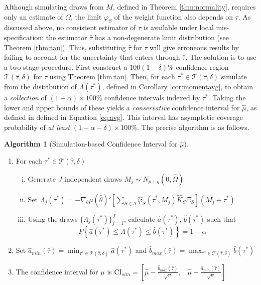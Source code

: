 \documentclass[12pt]{article}
\theoremstyle{definition}
\newtheorem{alg}{Algorithm}[section]
\begin{document}
Although simulating draws from $M$, defined in Theorem \ref{thm:normality}, requires only an estimate of $\Omega$, the limit $\varphi_S$ of the weight function also depends on $\tau$. 
As discussed above, no consistent estimator of $\tau$ is available under local mis-specification: the estimator $\widehat{\tau}$ has a non-degenerate limit distribution (see Theorem \ref{thm:tau}). 
Thus, substituting $\widehat{\tau}$ for $\tau$ will give erroneous results by failing to account for the uncertainty that enters through $\widehat{\tau}$. 
The solution is to use a two-stage procedure. 
First construct a  $100(1-\delta)\%$ confidence region $\mathscr{T}(\widehat{\tau},\delta)$ for $\tau$ using Theorem \ref{thm:tau}. 
Then, for each $\tau^* \in \mathscr{T}(\widehat{\tau},\delta)$ simulate from the distribution of $\Lambda(\tau^*)$, defined in Corollary \ref{cor:momentavg}, to obtain a \emph{collection} of $(1-\alpha)\times 100\%$ confidence intervals indexed by $\tau^*$. 
Taking the lower and upper bounds of these yields a \emph{conservative} confidence interval for $\widehat{\mu}$, as defined in defined in Equation \ref{eq:avg}. 
This interval has asymptotic coverage probability of \emph{at least} $(1-\alpha-\delta)\times 100\%$.
The precise algorithm is as follows.
\begin{alg}[Simulation-based Confidence Interval for $\widehat{\mu}$]
\label{alg:conf}
\mbox{}
\begin{enumerate}
	\item For each $\tau^* \in \mathscr{T}(\widehat{\tau},\delta)$ 
		\begin{enumerate}[(i)]
			\item Generate $J$ independent draws $M_j \sim N_{p+q}( 0, \widehat{\Omega} )$
			\item Set $\Lambda_j(\tau^*) = -\nabla_\theta\mu(\widehat{\theta})'\left[\sum_{S \in \mathscr{S}} \widehat{\varphi}_S(\tau^*,M_j) \widehat{K}_S\Xi_S\right] (M_j + \tau^*)$
			\item Using the draws $\{\Lambda_j(\tau^*)\}_{j=1}^J$, calculate $\widehat{a}(\tau^*)$, $\widehat{b}(\tau^*)$ such that
		$$P\left\{ \widehat{a}(\tau^*) \leq\Lambda(\tau^*)\leq \widehat{b}(\tau^*) \right\} = 1 - \alpha$$
		\end{enumerate}
	\item Set $\displaystyle \widehat{a}_{min}(\widehat{\tau})=\min_{\tau^* \in \mathscr{T}(\widehat{\tau},\delta)} \widehat{a}(\tau^*)$ and $\displaystyle \widehat{b}_{max}(\widehat{\tau})= \max_{\tau^* \in \mathscr{T}(\widehat{\tau},\delta)} \widehat{b}(\tau^*)$ \vspace{0.5em}
	\item The confidence interval for $\mu$ is
				$\displaystyle \mbox{CI}_{sim}=\left[ \widehat{\mu} - \frac{\widehat{b}_{max}(\widehat{\tau})}{\sqrt{n}}, \;\;\; \widehat{\mu} - \frac{\widehat{a}_{min}(\widehat{\tau})}{\sqrt{n}} \right]$
\end{enumerate}
\end{alg}
\end{document}

